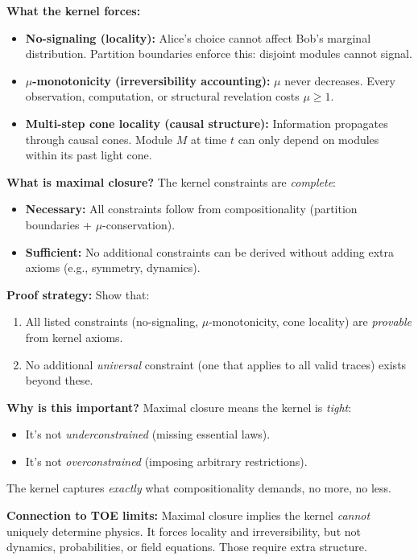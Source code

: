 \textbf{What the kernel forces:}
\begin{itemize}
    \item \textbf{No-signaling (locality):} Alice's choice cannot affect Bob's marginal distribution. Partition boundaries enforce this: disjoint modules cannot signal.
    
    \item \textbf{$\mu$-monotonicity (irreversibility accounting):} $\mu$ never decreases. Every observation, computation, or structural revelation costs $\mu \geq 1$.
    
    \item \textbf{Multi-step cone locality (causal structure):} Information propagates through causal cones. Module $M$ at time $t$ can only depend on modules within its past light cone.
\end{itemize}

\textbf{What is maximal closure?} The kernel constraints are \textit{complete}:
\begin{itemize}
    \item \textbf{Necessary:} All constraints follow from compositionality (partition boundaries + $\mu$-conservation).
    \item \textbf{Sufficient:} No additional constraints can be derived without adding extra axioms (e.g., symmetry, dynamics).
\end{itemize}

\textbf{Proof strategy:} Show that:
\begin{enumerate}
    \item All listed constraints (no-signaling, $\mu$-monotonicity, cone locality) are \textit{provable} from kernel axioms.
    \item No additional \textit{universal} constraint (one that applies to all valid traces) exists beyond these.
\end{enumerate}

\textbf{Why is this important?} Maximal closure means the kernel is \textit{tight}:
\begin{itemize}
    \item It's not \textit{underconstrained} (missing essential laws).
    \item It's not \textit{overconstrained} (imposing arbitrary restrictions).
\end{itemize}
The kernel captures \textit{exactly} what compositionality demands, no more, no less.

\textbf{Connection to TOE limits:} Maximal closure implies the kernel \textit{cannot} uniquely determine physics. It forces locality and irreversibility, but not dynamics, probabilities, or field equations. Those require extra structure.


